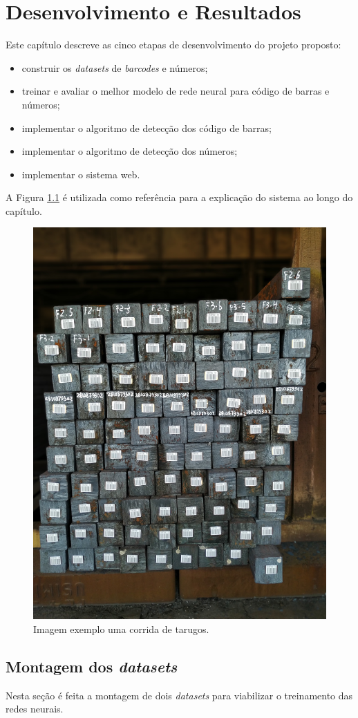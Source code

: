 
\chapter{Desenvolvimento e Resultados}

Este capítulo descreve as cinco etapas de desenvolvimento do projeto proposto:

\begin{itemize}
    \item construir os \textit{datasets} de \textit{barcodes} e números;
    \item treinar e avaliar o melhor modelo de rede neural para código de barras e números;
    \item implementar o algoritmo de detecção dos código de barras;
    \item implementar o algoritmo de detecção dos números;
    \item implementar o sistema web.
\end{itemize}

A Figura \ref{fig:imagemBase} é utilizada como referência para a explicação do sistema ao longo do capítulo.

\begin{figure}[h!]
	\centering
	\includegraphics[width=0.5\linewidth]{figuras/img1.jpg}
	\caption{Imagem exemplo uma corrida de tarugos.}
	\label{fig:imagemBase}
\end{figure}

\section{Montagem dos \textit{datasets}}

Nesta seção é feita a montagem de dois \textit{datasets} para viabilizar o treinamento das redes neurais. 

